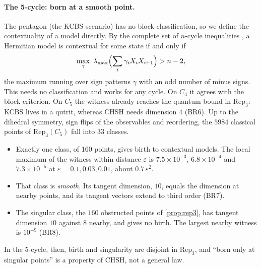 \documentclass[11pt]{article}
\theoremstyle{definition}\newtheorem{definition}[theorem]{Definition}\newtheorem{remark}[theorem]{Remark}\newtheorem{example}[theorem]{Example}
\begin{document}
\paragraph{The 5-cycle: born at a smooth point.}
The pentagon (the KCBS scenario) has no block classification, so we define the contextuality of a model directly. By the complete set of
$n$-cycle inequalities \cite{Araujo2013}, a Hermitian model is contextual for some state if and only if
\[\max_{\gamma}\ \lambda_{\max}\Bigl(\sum_i\gamma_iX_iX_{i+1}\Bigr)>n-2,\]
the maximum running over sign patterns $\gamma$ with an odd number of minus signs. This needs no classification and works for any cycle.
On $C_4$ it agrees with the block criterion. On $C_5$ the witness already reaches the quantum bound in $\mathrm{Rep}_3$: KCBS lives in a
qutrit, whereas CHSH needs dimension $4$ (BR6). Up to the dihedral symmetry, sign flips of the observables and reordering, the $5984$
classical points of $\mathrm{Rep}_3(C_5)$ fall into $33$ classes.
\begin{itemize}
\item Exactly one class, of $160$ points, gives birth to contextual models. The local maximum of the witness within distance $\varepsilon$
  is $7.5\times10^{-3}$, $6.8\times10^{-4}$ and $7.3\times10^{-5}$ at $\varepsilon=0.1,0.03,0.01$, about $0.7\,\varepsilon^2$.
\item That class is \emph{smooth}. Its tangent dimension, $10$, equals the dimension at nearby points, and its tangent vectors extend to
  third order (BR7).
\item The singular class, the $160$ obstructed points of \cref{prop:rep3}, has tangent dimension $10$ against $8$ nearby, and gives no
  birth. The largest nearby witness is $10^{-9}$ (BR8).
\end{itemize}
In the 5-cycle, then, birth and singularity are disjoint in $\mathrm{Rep}_3$, and ``born only at singular points'' is a property of CHSH,
not a general law.
\end{document}
